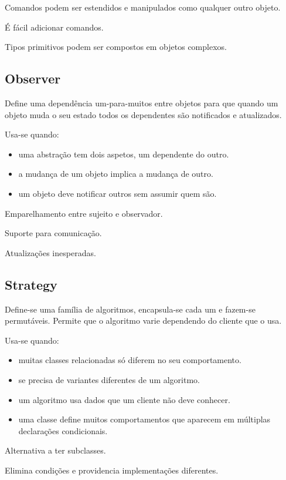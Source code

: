\documentclass[../resumosLPOO.tex]{subfiles}
\begin{document}
Comandos podem ser estendidos e manipulados como qualquer outro objeto.

É fácil adicionar comandos. 

Tipos primitivos podem ser compostos em objetos complexos.


\subsection{Observer}

Define uma dependência um-para-muitos entre objetos para que quando um objeto muda o seu estado todos os dependentes são notificados e atualizados.

Usa-se quando:
\begin{itemize}
    \item uma abstração tem dois aspetos, um dependente do outro.
    \item a mudança de um objeto implica a mudança de outro.
    \item um objeto deve notificar outros sem assumir quem são.
\end{itemize}

Emparelhamento entre sujeito e observador.

Suporte para comunicação.

Atualizações inesperadas.


\subsection{Strategy}

Define-se uma família de algoritmos, encapsula-se cada um e fazem-se permutáveis. Permite que o algoritmo varie dependendo do cliente que o usa.

Usa-se quando:
\begin{itemize}
    \item muitas classes relacionadas só diferem no seu comportamento.
    \item se precisa de variantes diferentes de um algoritmo.
    \item um algoritmo usa dados que um cliente não deve conhecer.
    \item uma classe define muitos comportamentos que aparecem em múltiplas declarações condicionais.
\end{itemize}

Alternativa a ter subclasses.

Elimina condições e providencia implementações diferentes.
\end{document}
